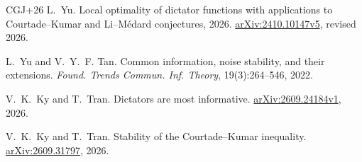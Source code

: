 \documentclass[11pt,letterpaper]{amsart}
\newcommand{\1}{\mathbf 1}
\numberwithin{equation}{section}
\begin{document}
\begin{thebibliography}{CGJ+26}
L.~Yu.
\newblock Local optimality of dictator functions with applications to
{Courtade--Kumar} and {Li--M\'edard} conjectures, 2026.
\newblock \href{https://arxiv.org/abs/2410.10147v5}{arXiv:2410.10147v5}, revised 2026.

L.~Yu and V.~Y.~F. Tan.
\newblock Common information, noise stability, and their extensions.
\newblock \emph{Found. Trends Commun. Inf. Theory},
19(3):264--546, 2022.

V.~K.~Ky and T.~Tran.
\newblock Dictators are most informative.
\newblock \href{https://arxiv.org/abs/2609.24184v1}{arXiv:2609.24184v1}, 2026.

V.~K.~Ky and T.~Tran.
\newblock Stability of the Courtade--Kumar inequality.
\newblock \href{https://arxiv.org/abs/2609.31797}{arXiv:2609.31797}, 2026.

\end{thebibliography}
\end{document}
